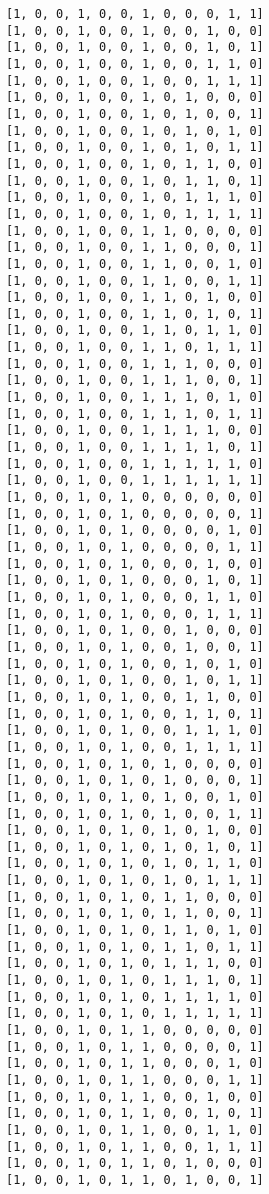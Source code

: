 \documentclass[11pt]{article}
\begin{document}
\begin{Verbatim}[commandchars=\\\{\}]
[1, 0, 0, 1, 0, 0, 1, 0, 0, 0, 1, 1]
[1, 0, 0, 1, 0, 0, 1, 0, 0, 1, 0, 0]
[1, 0, 0, 1, 0, 0, 1, 0, 0, 1, 0, 1]
[1, 0, 0, 1, 0, 0, 1, 0, 0, 1, 1, 0]
[1, 0, 0, 1, 0, 0, 1, 0, 0, 1, 1, 1]
[1, 0, 0, 1, 0, 0, 1, 0, 1, 0, 0, 0]
[1, 0, 0, 1, 0, 0, 1, 0, 1, 0, 0, 1]
[1, 0, 0, 1, 0, 0, 1, 0, 1, 0, 1, 0]
[1, 0, 0, 1, 0, 0, 1, 0, 1, 0, 1, 1]
[1, 0, 0, 1, 0, 0, 1, 0, 1, 1, 0, 0]
[1, 0, 0, 1, 0, 0, 1, 0, 1, 1, 0, 1]
[1, 0, 0, 1, 0, 0, 1, 0, 1, 1, 1, 0]
[1, 0, 0, 1, 0, 0, 1, 0, 1, 1, 1, 1]
[1, 0, 0, 1, 0, 0, 1, 1, 0, 0, 0, 0]
[1, 0, 0, 1, 0, 0, 1, 1, 0, 0, 0, 1]
[1, 0, 0, 1, 0, 0, 1, 1, 0, 0, 1, 0]
[1, 0, 0, 1, 0, 0, 1, 1, 0, 0, 1, 1]
[1, 0, 0, 1, 0, 0, 1, 1, 0, 1, 0, 0]
[1, 0, 0, 1, 0, 0, 1, 1, 0, 1, 0, 1]
[1, 0, 0, 1, 0, 0, 1, 1, 0, 1, 1, 0]
[1, 0, 0, 1, 0, 0, 1, 1, 0, 1, 1, 1]
[1, 0, 0, 1, 0, 0, 1, 1, 1, 0, 0, 0]
[1, 0, 0, 1, 0, 0, 1, 1, 1, 0, 0, 1]
[1, 0, 0, 1, 0, 0, 1, 1, 1, 0, 1, 0]
[1, 0, 0, 1, 0, 0, 1, 1, 1, 0, 1, 1]
[1, 0, 0, 1, 0, 0, 1, 1, 1, 1, 0, 0]
[1, 0, 0, 1, 0, 0, 1, 1, 1, 1, 0, 1]
[1, 0, 0, 1, 0, 0, 1, 1, 1, 1, 1, 0]
[1, 0, 0, 1, 0, 0, 1, 1, 1, 1, 1, 1]
[1, 0, 0, 1, 0, 1, 0, 0, 0, 0, 0, 0]
[1, 0, 0, 1, 0, 1, 0, 0, 0, 0, 0, 1]
[1, 0, 0, 1, 0, 1, 0, 0, 0, 0, 1, 0]
[1, 0, 0, 1, 0, 1, 0, 0, 0, 0, 1, 1]
[1, 0, 0, 1, 0, 1, 0, 0, 0, 1, 0, 0]
[1, 0, 0, 1, 0, 1, 0, 0, 0, 1, 0, 1]
[1, 0, 0, 1, 0, 1, 0, 0, 0, 1, 1, 0]
[1, 0, 0, 1, 0, 1, 0, 0, 0, 1, 1, 1]
[1, 0, 0, 1, 0, 1, 0, 0, 1, 0, 0, 0]
[1, 0, 0, 1, 0, 1, 0, 0, 1, 0, 0, 1]
[1, 0, 0, 1, 0, 1, 0, 0, 1, 0, 1, 0]
[1, 0, 0, 1, 0, 1, 0, 0, 1, 0, 1, 1]
[1, 0, 0, 1, 0, 1, 0, 0, 1, 1, 0, 0]
[1, 0, 0, 1, 0, 1, 0, 0, 1, 1, 0, 1]
[1, 0, 0, 1, 0, 1, 0, 0, 1, 1, 1, 0]
[1, 0, 0, 1, 0, 1, 0, 0, 1, 1, 1, 1]
[1, 0, 0, 1, 0, 1, 0, 1, 0, 0, 0, 0]
[1, 0, 0, 1, 0, 1, 0, 1, 0, 0, 0, 1]
[1, 0, 0, 1, 0, 1, 0, 1, 0, 0, 1, 0]
[1, 0, 0, 1, 0, 1, 0, 1, 0, 0, 1, 1]
[1, 0, 0, 1, 0, 1, 0, 1, 0, 1, 0, 0]
[1, 0, 0, 1, 0, 1, 0, 1, 0, 1, 0, 1]
[1, 0, 0, 1, 0, 1, 0, 1, 0, 1, 1, 0]
[1, 0, 0, 1, 0, 1, 0, 1, 0, 1, 1, 1]
[1, 0, 0, 1, 0, 1, 0, 1, 1, 0, 0, 0]
[1, 0, 0, 1, 0, 1, 0, 1, 1, 0, 0, 1]
[1, 0, 0, 1, 0, 1, 0, 1, 1, 0, 1, 0]
[1, 0, 0, 1, 0, 1, 0, 1, 1, 0, 1, 1]
[1, 0, 0, 1, 0, 1, 0, 1, 1, 1, 0, 0]
[1, 0, 0, 1, 0, 1, 0, 1, 1, 1, 0, 1]
[1, 0, 0, 1, 0, 1, 0, 1, 1, 1, 1, 0]
[1, 0, 0, 1, 0, 1, 0, 1, 1, 1, 1, 1]
[1, 0, 0, 1, 0, 1, 1, 0, 0, 0, 0, 0]
[1, 0, 0, 1, 0, 1, 1, 0, 0, 0, 0, 1]
[1, 0, 0, 1, 0, 1, 1, 0, 0, 0, 1, 0]
[1, 0, 0, 1, 0, 1, 1, 0, 0, 0, 1, 1]
[1, 0, 0, 1, 0, 1, 1, 0, 0, 1, 0, 0]
[1, 0, 0, 1, 0, 1, 1, 0, 0, 1, 0, 1]
[1, 0, 0, 1, 0, 1, 1, 0, 0, 1, 1, 0]
[1, 0, 0, 1, 0, 1, 1, 0, 0, 1, 1, 1]
[1, 0, 0, 1, 0, 1, 1, 0, 1, 0, 0, 0]
[1, 0, 0, 1, 0, 1, 1, 0, 1, 0, 0, 1]

\end{Verbatim}
\end{document}
